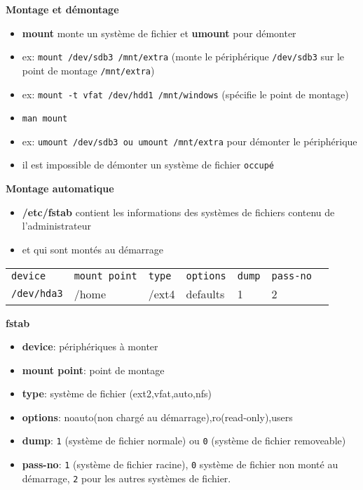 \documentclass[french]{beamer}
\begin{document}
\begin{frame}
\textbf{Montage et démontage}
\begin{itemize}
\item \textbf{mount} monte un système de fichier et \textbf{umount} pour démonter
\item ex: \texttt{mount /dev/sdb3 /mnt/extra} (monte le périphérique
\texttt{/dev/sdb3} sur le point de montage \texttt{/mnt/extra})
\item ex: \texttt{mount -t vfat /dev/hdd1 /mnt/windows} (spécifie le point de
montage)
\item \texttt{man mount}
\item ex: \texttt{umount /dev/sdb3 ou umount /mnt/extra} pour démonter le périphérique
\item il est impossible de démonter un système de fichier \texttt{occupé}
\end{itemize}
\end{frame}

\begin{frame}
\textbf{Montage automatique}
\begin{itemize}
\item \textbf{/etc/fstab} contient les informations des systèmes de fichiers
contenu de l'administrateur
\item et qui sont montés au démarrage
\end{itemize}
\begin{tabular}{l l l l l l l}
\texttt{device} & \texttt{mount point} & \texttt{type} &
\texttt{options} & \texttt{dump} & \texttt{pass-no}\\
\texttt{/dev/hda3} & /home & /ext4 & defaults & 1 & 2
\end{tabular}
\end{frame}

\begin{frame}
\textbf{fstab}
\begin{itemize}
\item \textbf{device}: périphériques à monter
\item \textbf{mount point}: point de montage
\item \textbf{type}: système de fichier (ext2,vfat,auto,nfs)
\item \textbf{options}: noauto(non chargé au démarrage),ro(read-only),users
\item \textbf{dump}: \texttt{1} (système de fichier normale) ou \texttt{0}
(système de fichier removeable)
\item \textbf{pass-no}: \texttt{1} (système de fichier racine), \texttt{0}
système de fichier non monté au démarrage, \texttt{2} pour les autres systèmes
de fichier.
\end{itemize}
\end{frame}
\end{document}
